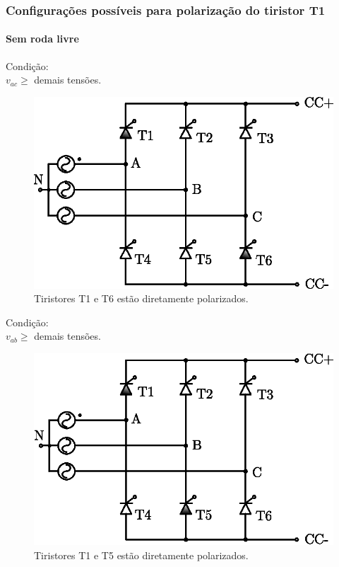 \documentclass[aspectratio=43]{beamer}
\begin{document}
\begin{frame}
	\frametitle{Configurações possíveis para polarização do tiristor T1}
	\framesubtitle{Sem roda livre}
	
	\begin{minipage}{0.5\textwidth}\centering
		Condição:\\ $v_{ac} \ge $ demais tensões.
		\begin{figure}
			\centering
			\includegraphics[width=0.9\linewidth]{figuras/GraetzTiristorT1T6}
			\caption{Tiristores T1 e T6 estão diretamente polarizados.}
			\label{fig:GraetzTiristorT1T6}
		\end{figure}	
	\end{minipage}%
	\begin{minipage}{0.5\textwidth}\centering
		Condição:\\ $v_{ab} \ge $ demais tensões.
		\begin{figure}
			\centering
			\includegraphics[width=0.9\linewidth]{figuras/GraetzTiristorT1T5}
			\caption{Tiristores T1 e T5 estão diretamente polarizados.}
			\label{fig:GraetzTiristorT1T5}
		\end{figure}
		
	\end{minipage}
	
\end{frame}
\end{document}
